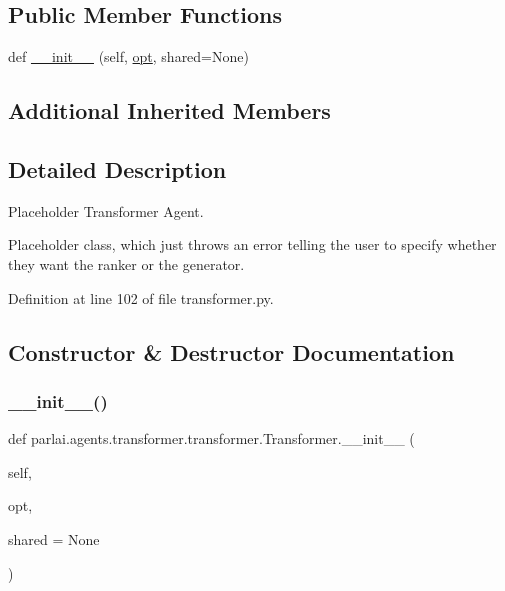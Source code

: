 \subsection*{Public Member Functions}
\begin{DoxyCompactItemize}
\item 
def \hyperlink{classparlai_1_1agents_1_1transformer_1_1transformer_1_1Transformer_ac71f8b1da727e5a62f56700fd87f3d60}{\+\_\+\+\_\+init\+\_\+\+\_\+} (self, \hyperlink{classparlai_1_1core_1_1agents_1_1Agent_ab3b45d2754244608c75d4068b90cd051}{opt}, shared=None)
\end{DoxyCompactItemize}
\subsection*{Additional Inherited Members}


\subsection{Detailed Description}
\begin{DoxyVerb}Placeholder Transformer Agent.

Placeholder class, which just throws an error telling the user to specify whether
they want the ranker or the generator.
\end{DoxyVerb}
 

Definition at line 102 of file transformer.\+py.



\subsection{Constructor \& Destructor Documentation}
\mbox{\label{classparlai_1_1agents_1_1transformer_1_1transformer_1_1Transformer_ac71f8b1da727e5a62f56700fd87f3d60}} 
\subsubsection{\texorpdfstring{\+\_\+\+\_\+init\+\_\+\+\_\+()}{\_\_init\_\_()}}
{\footnotesize\ttfamily def parlai.\+agents.\+transformer.\+transformer.\+Transformer.\+\_\+\+\_\+init\+\_\+\+\_\+ (\begin{DoxyParamCaption}\item[{}]{self,  }\item[{}]{opt,  }\item[{}]{shared = {\ttfamily None} }\end{DoxyParamCaption})}




